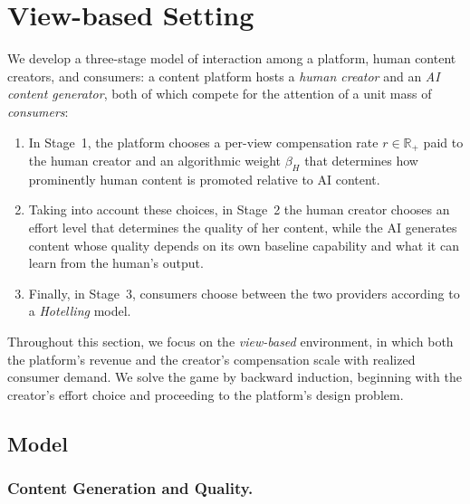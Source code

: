 \section{View-based Setting}\label{sec:view}

We develop a three-stage model of interaction among a platform, human content creators, and consumers: a content platform hosts a 
\emph{human creator} and an \emph{AI content generator}, both of which compete 
for the attention of a unit mass of \emph{consumers}:
\begin{enumerate}
    \item In Stage~1, the platform chooses a per-view compensation 
rate $r \in \mathbb{R}_+$ paid to the human creator and an algorithmic weight $\beta_H$ 
that determines how prominently human content is promoted relative to 
AI content. 
\item Taking into account these choices, in Stage~2 the human 
creator chooses an effort level that determines the quality of her 
content, while the AI generates content whose quality depends on its 
own baseline capability and what it can learn from the human's 
output. 
\item Finally, in Stage~3, consumers choose between the two providers 
according to a \emph{Hotelling} model. 
\end{enumerate}

Throughout this 
section, we focus on the  \emph{view-based} environment, in 
which both the platform's revenue and the creator's compensation 
scale with realized consumer demand. We solve the game by backward 
induction, beginning with the creator's effort choice and proceeding 
to the platform's design problem.

\subsection{Model}

\subsubsection*{Content Generation and Quality.}

